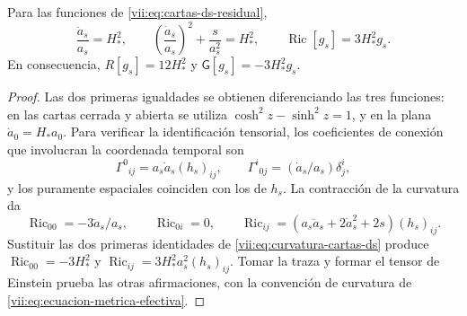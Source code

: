 \begin{lemma}
\label{vii:lem:curvatura-cartas-ds}
Para las funciones de \eqref{vii:eq:cartas-ds-residual},
\begin{equation}
 \frac{\ddot a_s}{a_s}=H_*^2,\qquad
 \left(\frac{\dot a_s}{a_s}\right)^2+\frac{s}{a_s^2}=H_*^2,
 \qquad
 \operatorname{Ric}[g_s]=3H_*^2g_s.
 \label{vii:eq:curvatura-cartas-ds}
\end{equation}
En consecuencia, \(R[g_s]=12H_*^2\) y
\(\mathsf G[g_s]=-3H_*^2g_s\).
\end{lemma}
\begin{proof}
Las dos primeras igualdades se obtienen diferenciando las tres funciones:
en las cartas cerrada y abierta se utiliza
\(\cosh^2z-\sinh^2z=1\), y en la plana
\(\dot a_0=H_*a_0\). Para verificar la identificación tensorial,
los coeficientes de conexión que involucran la coordenada temporal son
\[
 \Gamma^0{}_{ij}=a_s\dot a_s(h_s)_{ij},\qquad
 \Gamma^i{}_{0j}=(\dot a_s/a_s)\delta^i_j,
\]
y los puramente espaciales coinciden con los de \(h_s\).
La contracción de la curvatura da
\[
 \operatorname{Ric}_{00}=-3\ddot a_s/a_s,\qquad
 \operatorname{Ric}_{0i}=0,\qquad
 \operatorname{Ric}_{ij}
  =(a_s\ddot a_s+2\dot a_s^2+2s)(h_s)_{ij}.
\]
Sustituir las dos primeras identidades de
\eqref{vii:eq:curvatura-cartas-ds} produce
\(\operatorname{Ric}_{00}=-3H_*^2\) y
\(\operatorname{Ric}_{ij}=3H_*^2a_s^2(h_s)_{ij}\).
Tomar la traza y formar el tensor de Einstein prueba las otras
afirmaciones, con la convención de curvatura de
\eqref{vii:eq:ecuacion-metrica-efectiva}.
\end{proof}

